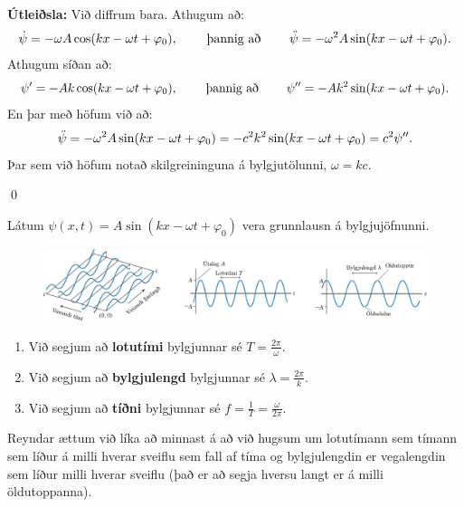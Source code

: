 \ifdefined \wholebook \else\documentclass[oneside]{book}\usepackage{EdlBook}\graphicspath{{figures/}}
\begin{document}
\textbf{Útleiðsla:} Við diffrum bara. Athugum að:
\begin{align*}
    \dot{\psi} = -\omega A \cos(kx - \omega t + \varphi_0), \hspace{0.8cm} \text{þannig að} \hspace{0.8cm} \Ddot{\psi} = -\omega^2 A \sin(kx - \omega t + \varphi_0).
\end{align*}
Athugum síðan að:
\begin{align*}
    \psi' = -Ak \cos(kx - \omega t + \varphi_0), \hspace{0.8cm} \text{þannig að} \hspace{0.8cm} \psi'' = -Ak^2 \sin(kx - \omega t + \varphi_0).
\end{align*}
En þar með höfum við að:
\begin{align*}
    \Ddot{\psi} = -\omega^2 A\sin(kx-\omega t + \varphi_0) = -c^2k^2 \sin(kx - \omega t + \varphi_0) = c^2 \psi''.
\end{align*}
Þar sem við höfum notað skilgreininguna á bylgjutölunni, $\omega = kc$.

\qed

\begin{tcolorbox}
\begin{definition}
Látum $\psi(x,t) = A\sin(kx - \omega t + \varphi_0)$ vera grunnlausn á bylgjujöfnunni.
\begin{figure}[H]
    \centering
    \includegraphics[scale = 0.8]{figures/waves.pdf}
\end{figure}
\begin{enumerate}[label = \textbf{(\roman*)}]
    \item Við segjum að \textbf{lotutími} bylgjunnar sé $T = \frac{2\pi}{\omega}$.
    \item Við segjum að \textbf{bylgjulengd} bylgjunnar sé $\lambda = \frac{2\pi}{k}$.
    \item Við segjum að \textbf{tíðni} bylgjunnar sé $f = \frac{1}{T} = \frac{\omega}{2\pi}$.
\end{enumerate}
\end{definition}
\end{tcolorbox}

Reyndar ættum við líka að minnast á að við hugsum um lotutímann sem tímann sem líður á milli hverar sveiflu sem fall af tíma og bylgjulengdin er vegalengdin sem líður milli hverar sveiflu (það er að segja hversu langt er á milli öldutoppanna).
\end{document}
